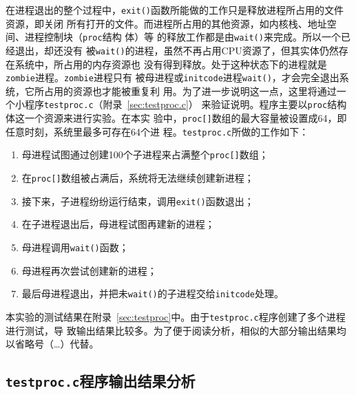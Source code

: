 \documentclass{swfcthesismscctex}
\begin{document}
在进程退出的整个过程中，\texttt{exit()}函数所能做的工作只是释放进程所占用的文件资源，即关闭
所有打开的文件。而进程所占用的其他资源，如内核栈、地址空间、进程控制块（\texttt{proc}结构
体）等
的释放工作都是由\texttt{wait()}来完成。所以一个已经退出，却还没有
被\texttt{wait()}的进程，虽然不再占用CPU资源了，但其实体仍然存在系统中，所占用的内存资源也
没有得到释放。处于这种状态下的进程就是\texttt{zombie}进程。\texttt{zombie}进程只有
被母进程或\texttt{initcode}进程\texttt{wait()}，才会完全退出系统，它所占用的资源也才能被重复利
用。为了进一步说明这一点，这里将通过一个小程序\texttt{testproc.c}（附录~\ref{sec:testproc.c}）
来验证说明。程序主要以\texttt{proc}结构体这一个资源来进行实验。在本实
验中，\texttt{proc[]}数组的最大容量被设置成64，即任意时刻，系统里最多可存在64个进
程。\texttt{testproc.c}所做的工作如下：
\begin{enumerate}
\item 母进程试图通过创建100个子进程来占满整个\texttt{proc[]}数组；
\item 在\texttt{proc[]}数组被占满后，系统将无法继续创建新进程；
\item 接下来，子进程纷纷运行结束，调用\texttt{exit()}函数退出；
\item 在子进程退出后，母进程试图再建新的进程；
\item 母进程调用\texttt{wait()}函数；
\item 母进程再次尝试创建新的进程；
\item 最后母进程退出，并把未\texttt{wait()}的子进程交给\texttt{initcode}处理。
\end{enumerate}

本实验的测试结果在附录~\ref{sec:testproc}中。由于\texttt{testproc.c}程序创建了多个进程进行测试，导
致输出结果比较多。为了便于阅读分析，相似的大部分输出结果均以省略号（\ldots）代替。

\subsection{\texttt{testproc.c}程序输出结果分析}
\end{document}
